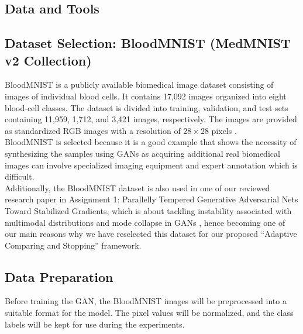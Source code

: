 \documentclass[12pt,a4paper]{report}
\begin{document}
\begin{justify}
\section{Data and Tools}

\subsection{Dataset Selection: BloodMNIST (MedMNIST v2 Collection)}
BloodMNIST is a publicly available biomedical image dataset consisting of images of individual blood cells. It contains 17,092 images organized into eight blood-cell classes. The dataset is divided into training, validation, and test sets containing 11,959, 1,712, and 3,421 images, respectively. The images are provided as standardized RGB images with a resolution of $28 \times 28$ pixels \parencite{medmnist}. \\

\noindent BloodMNIST is selected because it is a good example that shows the necessity of synthesizing the samples using GANs as acquiring additional real biomedical images can involve specialized imaging equipment and expert annotation which is difficult. \\

\noindent Additionally, the BloodMNIST dataset is also used in one of our reviewed research paper in Assignment 1: Parallelly Tempered Generative Adversarial Nets Toward Stabilized Gradients, which is about tackling instability associated with multimodal distributions and mode collapse in GANs \parencite{sohn2026parallelly}, hence becoming one of our main reasons why we have reselected this dataset for our proposed ``Adaptive Comparing and Stopping'' framework.

\subsection{Data Preparation}
Before training the GAN, the BloodMNIST images will be preprocessed into a suitable format for the model. The pixel values will be normalized, and the class labels will be kept for use during the experiments. \\


\end{justify}
\end{document}

